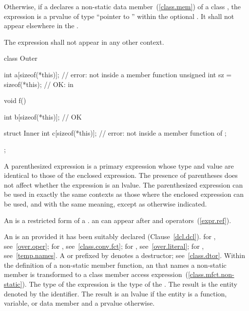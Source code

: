 \pnum
Otherwise, if a  declares a non-static data
member~(\ref{class.mem}) of a class , the expression  is
a prvalue of type ``pointer to '' within the
optional . It shall not appear elsewhere
in the .

\pnum
The expression  shall not appear in any other context.
\enterexample
\begin{codeblock}
class Outer {
  int a[sizeof(*this)];               // error: not inside a member function
  unsigned int sz = sizeof(*this);    // OK: in 

  void f() {
    int b[sizeof(*this)];             // OK

    struct Inner {
      int c[sizeof(*this)];           // error: not inside a member function of 
    };
  }
};
\end{codeblock}
\exitexample

\pnum
{}%
A parenthesized expression is a primary expression whose type and value
are identical to those of the enclosed expression. The presence of
parentheses does not affect whether the expression is an lvalue. The
parenthesized expression can be used in exactly the same contexts as
those where the enclosed expression can be used, and with the same
meaning, except as otherwise indicated.

\pnum
{}%
%
An  is a restricted form of a
.
\enternote 
an  can appear after  and \tcode{->}
operators~(\ref{expr.ref}).
\exitnote 

\pnum
{}%
An  is an  provided it has
been suitably declared (Clause~\ref{dcl.dcl}).
\enternote 
for , see~\ref{over.oper}; for
, see~\ref{class.conv.fct}; for
, see~\ref{over.literal}; for
, see~\ref{temp.names}. A 
or 
prefixed by \tcode{\tilde} denotes a destructor; see~\ref{class.dtor}.
Within the definition of a non-static member function, an
 that names a non-static member is transformed to a
class member access expression~(\ref{class.mfct.non-static}).
\exitnote 
The type of the expression is the type of the . The
result is the entity denoted by the identifier. The result is an lvalue
if the entity is a function, variable, or data member and a prvalue otherwise.
\clearpage

